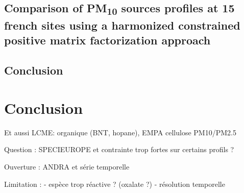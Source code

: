 \subsection{Comparison of PM\textsubscript{10} sources profiles at 15 french sites using a harmonized constrained positive matrix factorization approach}%
\label{sub:article}

\subsection{Conclusion}%
\label{sub:conclusion}



% 

%
% 


\section{Conclusion}%
\label{sec:conclusion}

Et aussi LCME: organique (BNT, hopane), EMPA cellulose PM10/PM2.5

Question : SPECIEUROPE et contrainte trop fortes sur certains profils ?

Ouverture : ANDRA et série temporelle

Limitation : 
- espèce trop réactive ? (oxalate ?)
- résolution temporelle

